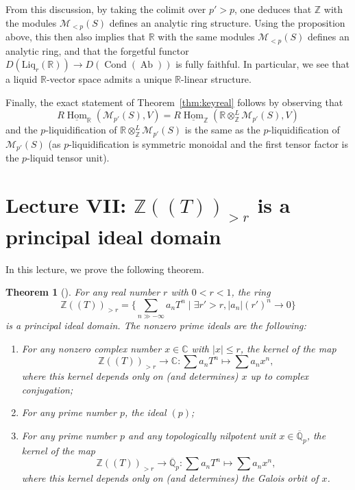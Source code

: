 \documentclass[11pt]{amsbook}
\DeclareMathOperator{\Hom}{Hom}
\newcommand{\intHom}{\underline{\Hom}}
\DeclareMathOperator{\Cond}{Cond}
\DeclareMathOperator{\Ab}{Ab}
\numberwithin{equation}{section}
\newtheorem{theorem}{Theorem}
\numberwithin{theorem}{section}
\theoremstyle{definition}
\begin{document}
From this discussion, by taking the colimit over $p'>p$, one deduces that $\mathbb Z$ with the modules $\mathcal M_{<p}(S)$ defines an analytic ring structure. Using the proposition above, this then also implies that $\mathbb R$ with the same modules $\mathcal M_{<p}(S)$ defines an analytic ring, and that the forgetful functor $D(\mathrm{Liq}_r(\mathbb R))\to D(\Cond(\Ab))$ is fully faithful. In particular, we see that a liquid $\mathbb R$-vector space admits a unique $\mathbb R$-linear structure.

Finally, the exact statement of Theorem~\ref{thm:keyreal} follows by observing that
\[
R\intHom_{\mathbb R}(\mathcal M_{p'}(S),V) = R\intHom_{\mathbb Z}(\mathbb R\otimes^L_{\mathbb Z} \mathcal M_{p'}(S),V)
\]
and the $p$-liquidification of $\mathbb R\otimes^L_{\mathbb Z} \mathcal M_{p'}(S)$ is the same as the $p$-liquidification of $\mathcal M_{p'}(S)$ (as $p$-liquidification is symmetric monoidal and the first tensor factor is the $p$-liquid tensor unit).

\newpage

\section{Lecture VII: $\mathbb Z((T))_{>r}$ is a principal ideal domain}

In this lecture, we prove the following theorem.

\begin{theorem}[\cite{HarbaterConvergentArithmetic}]\label{thm:principalideal} For any real number $r$ with $0<r<1$, the ring
\[
\mathbb Z((T))_{>r} = \{\sum_{n\gg -\infty} a_n T^n\mid \exists r'>r, |a_n| (r')^n\to 0\}
\]
is a principal ideal domain. The nonzero prime ideals are the following:
\begin{enumerate}
\item For any nonzero complex number $x\in \mathbb C$ with $|x|\leq r$, the kernel of the map
\[
\mathbb Z((T))_{>r}\to \mathbb C: \sum a_n T^n\mapsto \sum a_n x^n,
\]
where this kernel depends only on (and determines) $x$ up to complex conjugation;
\item For any prime number $p$, the ideal $(p)$;
\item For any prime number $p$ and any topologically nilpotent unit $x\in \overline{\mathbb Q}_p$, the kernel of the map
\[
\mathbb Z((T))_{>r}\to \overline{\mathbb Q}_p: \sum a_n T^n\mapsto \sum a_n x^n,
\]
where this kernel depends only on (and determines) the Galois orbit of $x$.
\end{enumerate}
\end{theorem}
\end{document}
